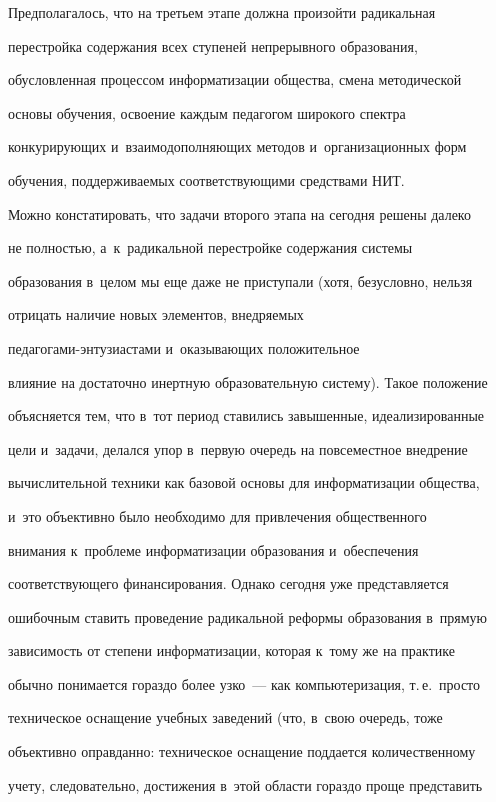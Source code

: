  Предполагалось, что на третьем этапе должна произойти радикальная


перестройка содержания всех ступеней непрерывного образования,


обусловленная процессом информатизации общества, смена методической


основы обучения, освоение каждым педагогом широкого спектра


конкурирующих и~взаимодополняющих методов и~организационных форм


обучения, поддерживаемых соответствующими средствами НИТ.





 Можно констатировать, что задачи второго этапа на сегодня решены далеко


не полностью, а~к~радикальной перестройке содержания системы


образования в~целом мы еще даже не приступали (хотя, безусловно, нельзя


отрицать наличие новых элементов, внедряемых


 пе\-да\-го\-га\-ми-энту\-зи\-а\-ста\-ми и~оказывающих положительное


влияние на достаточно инертную образовательную систему). Такое положение


объясняется тем, что в~тот период ставились завышенные, идеализированные


цели и~задачи, делался упор в~первую очередь на повсеместное внедрение


вычислительной техники как базовой основы для информатизации общества,


и~это объективно было необходимо для привлечения общественного


внимания к~проблеме информатизации образования и~обеспечения


соответст\-ву\-юще\-го финансирования. Однако сегодня уже представляется


ошибочным ставить проведение радикальной реформы образования в~прямую


зависимость от степени информатизации, которая к~тому же на практике


обычно понимается гораздо более узко~--- как компьютеризация, т.\,е.\ просто


техническое оснащение учебных заведений (что, в~свою очередь, тоже


объективно оправданно: техническое оснащение поддается количественному


учету, следовательно, достижения в~этой области гораздо проще представить


